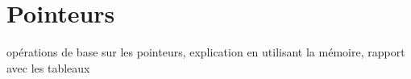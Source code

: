 \chapter{Pointeurs}

opérations de base sur les pointeurs, explication en utilisant la mémoire, rapport avec les tableaux